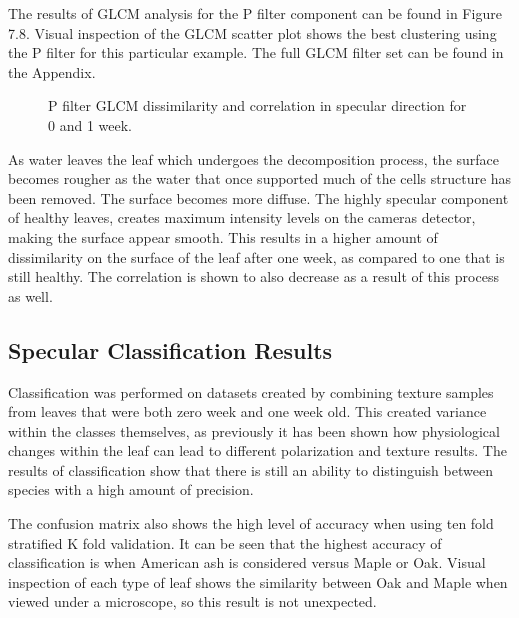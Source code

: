 The results of GLCM analysis for the P filter component can be found in Figure 7.8.  Visual inspection of the GLCM scatter plot shows the best clustering using the P filter for this particular example.  The full GLCM filter set can be found in the Appendix.
%
\begin{figure}[!htb]
    \begin{center}
    \end{center}
    \caption{P filter GLCM dissimilarity and correlation in specular direction for 0 and 1 week.}
    \label{fig:polarization}
\end{figure}
%
As water leaves the leaf which undergoes the decomposition process, the surface becomes rougher as the water that once supported much of the cells structure has been removed. The surface becomes more diffuse.  The highly specular component of healthy leaves, creates maximum intensity levels on the cameras detector, making the surface appear smooth.  This results in a higher amount of dissimilarity on the surface of the leaf after one week, as compared to one that is still healthy.  The correlation is shown to also decrease as a result of this process as well.

\subsection{Specular Classification Results}
Classification was performed on datasets created by combining texture samples from leaves that were both zero week and one week old.  This created variance within the classes themselves, as previously it has been shown how physiological changes within the leaf can lead to different polarization and texture results.  The results of classification show that there is still an ability to distinguish between species with a high amount of precision.

The confusion matrix also shows the high level of accuracy when using ten fold stratified K fold validation.  It can be seen that the highest accuracy of classification is when American ash is considered versus Maple or Oak.  Visual inspection of each type of leaf shows the similarity between Oak and Maple when viewed under a microscope, so this result is not unexpected.

